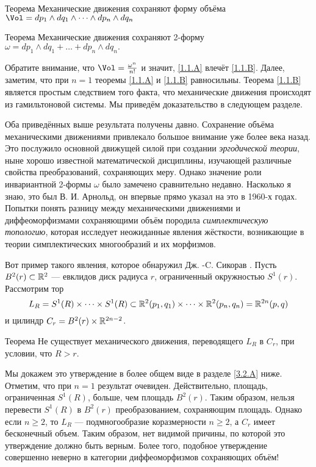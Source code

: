 \begin{thm}{Теорема}\label{1.1.A}
Механические движения сохраняют форму объёма 
$\Vol=dp_1\wedge dq_1\wedge\dots\wedge d p_n\wedge dq_n$
\end{thm}

\begin{thm}{Теорема}\label{1.1.B}
Механические движения сохраняют 2-форму $\omega = dp_1 \wedge dq_1 +\dots
+ dp_n \wedge dq_n.$
\end{thm}

Обратите внимание, что $\Vol = \tfrac{\omega^n}{n!}$ и значит, \ref{1.1.A} влечёт \ref{1.1.B}.
Далее, заметим, что при $n = 1$ теоремы \ref{1.1.A} и \ref{1.1.B} равносильны.
Теорема \ref{1.1.B} является простым следствием того факта, что механические движения происходят из гамильтоновой системы.
Мы приведём доказательство в следующем разделе.

Оба приведённых выше результата получены давно.
Сохранение объёма механическими движениями привлекало большое внимание уже более века назад.
Это послужило основной движущей силой при создании \emph{эргодической теории}, ныне хорошо известной математической дисциплины, изучающей различные свойства  преобразований, сохраняющих меру.
Однако значение роли инвариантной 2-формы $\omega$ было замечено сравнительно недавно.
Насколько я знаю, это был В. И. Арнольд, он впервые прямо указал на это в 1960-х годах.
Попытки понять разницу между механическими движениями и диффеоморфизмами сохраняющими объём породила \emph{симплектическую топологию}, которая исследует неожиданные явления жёсткости, возникающие в теории симплектических многообразий и их морфизмов.

Вот пример такого явления, которое обнаружил Дж. -C. Сикорав \cite{S1}.
Пусть $B^2(r) \subset \mathbb{R}^2$ --- евклидов диск радиуса $r$, ограниченный окружностью $S^1(r)$.
Рассмотрим тор 
\[L_R = 
S^1 (R) \times\dots\times S^1(R) \subset \mathbb{R}^2 (p_1, q_1) \times\dots\times \mathbb{R}^2 (p_n, q_n) =\mathbb{R}^{2n} (p, q)\]
и цилиндр $C_r = B^2 (r) \times \mathbb{R}^{2n-2}$.

\begin{thm}{Теорема}\label{1.1.C}
Не существует механического движения, переводящего $L_R$ в $C_r$, при условии, что $R>r$.
\end{thm}

Мы докажем это утверждение в более общем виде в разделе \ref{3.2.A} ниже.
Отметим, что при $n = 1$ результат очевиден.
Действительно, площадь, ограниченная $S^1 (R)$, больше, чем площадь $B^2 (r)$.
Таким образом, нельзя перевести $S^1(R)$ в $B^2(r)$ преобразованием, сохраняющим площадь.
Однако если $n \ge 2$, то $L_R$ --- подмногообразие коразмерности $n \ge 2$, а $C_r$ имеет бесконечный объем.
Таким образом, нет видимой причины, по которой это утверждение должно быть верным.
Более того, подобное утверждение совершенно неверно в категории диффеоморфизмов сохраняющих объём!


